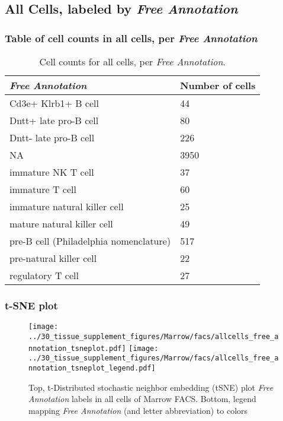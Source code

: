 \clearpage

\subsection{All Cells, labeled by \emph{Free Annotation}}
\subsubsection{Table of cell counts in all cells, per \emph{Free Annotation}}\begin{table}[h]
\centering
\label{my-label}
\begin{tabular}{@{}ll@{}}
\toprule

\emph{Free Annotation}& Number of cells \\ \midrule
Cd3e+ Klrb1+ B cell & 44 \\

Dntt+ late pro-B cell & 80 \\

Dntt- late pro-B cell & 226 \\

NA & 3950 \\

immature NK T cell & 37 \\

immature T cell & 60 \\

immature natural killer cell & 25 \\

mature natural killer cell & 49 \\

pre-B cell (Philadelphia nomenclature) & 517 \\

pre-natural killer cell & 22 \\

regulatory T cell & 27 \\
\bottomrule
\end{tabular}
\caption{Cell counts for all cells, per \emph{Free Annotation}.}
\end{table}

\clearpage
\subsubsection{t-SNE plot}
\begin{figure}[h]
\centering
\texttt{[image: ../30\_tissue\_supplement\_figures/Marrow/facs/allcells\_free\_annotation\_tsneplot.pdf]}
\texttt{[image: ../30\_tissue\_supplement\_figures/Marrow/facs/allcells\_free\_annotation\_tsneplot\_legend.pdf]}
\caption{Top, t-Distributed stochastic neighbor embedding (tSNE) plot  \emph{Free Annotation} labels in all cells of Marrow FACS. Bottom, legend mapping \emph{Free Annotation} (and letter abbreviation) to colors}
\end{figure}


